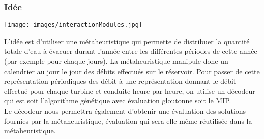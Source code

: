 \documentclass[a4paper]{report}
\begin{document}
\subsubsection{Idée}
\begin{center}
\texttt{[image: images/interactionModules.jpg]}
\end{center}
L'idée est d'utiliser une métaheuristique qui permette de distribuer la quantité totale d'eau à évacuer durant l'année entre les différentes périodes de cette année (par exemple pour chaque jours).  La métaheuristique manipule donc un calendrier au jour le jour des débits effectués sur le réservoir. Pour passer de cette représentation périodiques des débit à une représentation donnant le débit effectué pour chaque turbine et conduite heure par heure, on utilise un décodeur qui est soit l'algorithme génétique avec évaluation gloutonne soit le MIP.\\
Le décodeur nous permettra également d'obtenir une évaluation des solutions fournies par la métaheuristique, évaluation qui sera elle même réutilisée dans la métaheuristique.\\
\end{document}
